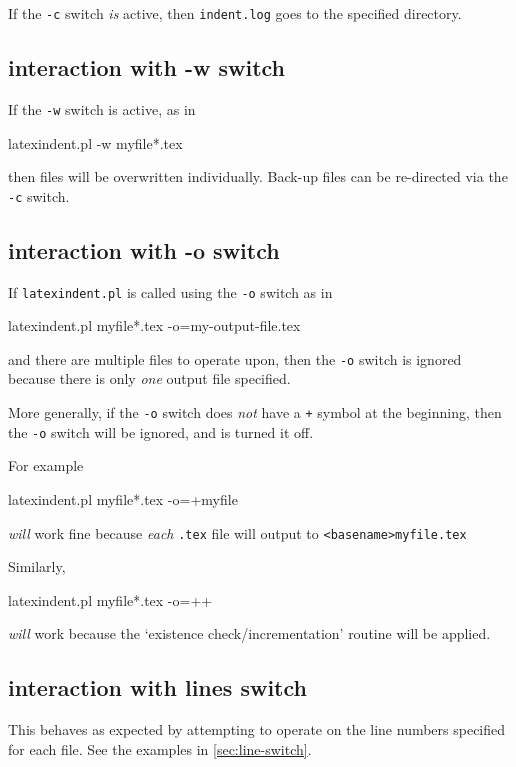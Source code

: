   If the \texttt{-c} switch \emph{is} active, then \texttt{indent.log} goes to the
  specified directory.

 \subsection{interaction with -w switch}
  If the \texttt{-w} switch is active, as in

  \begin{commandshell}
latexindent.pl -w myfile*.tex
\end{commandshell}

  then files will be overwritten individually. Back-up files can be re-directed via the
  \texttt{-c} switch.

 \subsection{interaction with -o switch}
  If \texttt{latexindent.pl} is called using the \texttt{-o} switch as in

  \begin{commandshell}
latexindent.pl myfile*.tex -o=my-output-file.tex 
        \end{commandshell}

  and there are multiple files to operate upon, then the \texttt{-o} switch is ignored
  because there is only \emph{one} output file specified.

  More generally, if the \texttt{-o} switch does \emph{not} have a \texttt{+} symbol at
  the beginning, then the \texttt{-o} switch will be ignored, and is turned it off.

  For example

  \begin{commandshell}
latexindent.pl myfile*.tex -o=+myfile
\end{commandshell}

  \emph{will} work fine because \emph{each} \texttt{.tex} file will output to
  \texttt{<basename>myfile.tex}

  Similarly,

  \begin{commandshell}
latexindent.pl myfile*.tex -o=++
\end{commandshell}

  \emph{will} work because the `existence check/incrementation' routine will be applied.

 \subsection{interaction with lines switch}
  This behaves as expected by attempting to operate on the line numbers specified for each file. See
  the examples in \cref{sec:line-switch}.


